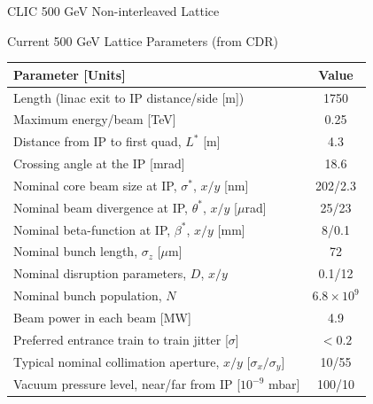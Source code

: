 \documentclass{beamer}
\begin{document}
\begin{frame}
 \color{blue}\Large CLIC 500 GeV Non-interleaved Lattice
\end{frame}
\begin{frame}{Current 500 GeV Lattice Parameters (from CDR)}
\begin{center}
 \begin{tabular}{|l|c|}\hline\hline
  \textbf{Parameter [Units]} & \textbf{Value}\\\hline
  Length (linac exit to IP distance/side [m]) & 1750\\
  Maximum energy/beam [TeV] & 0.25\\
  Distance from IP to first quad, $L^*$ [m] & 4.3\\
  Crossing angle at the IP [mrad] & 18.6\\
  Nominal core beam size at IP, $\sigma^*$, $x/y$ [nm] & 202/2.3\\
  Nominal beam divergence at IP, $\theta^*$, $x/y$ [$\mu$rad] & 25/23\\
  Nominal beta-function at IP, $\beta^*$, $x/y$ [mm] & 8/0.1\\
  Nominal bunch length, $\sigma_z$ [$\mu$m] & 72\\
  Nominal disruption parameters, $D$, $x/y$ & 0.1/12\\
  Nominal bunch population, $N$ & $6.8\times10^9$\\
  Beam power in each beam [MW] & 4.9\\
  Preferred entrance train to train jitter [$\sigma$] & $<0.2$\\
  Typical nominal collimation aperture, $x/y$ [$\sigma_x/\sigma_y$] & 10/55\\
  Vacuum pressure level, near/far from IP [$10^{-9}$ mbar] & 100/10\\\hline
 \end{tabular}
 \end{center}
\end{frame}
\end{document}

